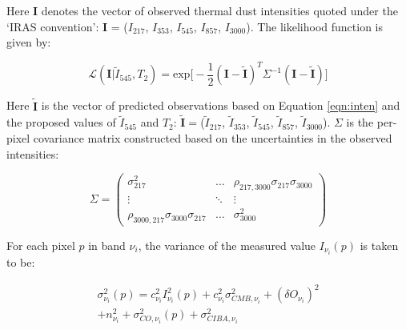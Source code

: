 \documentclass{emulateapj}
\begin{document}
Here $\mathbf{I}$ denotes the vector of observed thermal dust intensities 
quoted under the `IRAS convention': $\mathbf{I}$ = ($I_{217}$, $I_{353}$,
$I_{545}$, $I_{857}$, $I_{3000}$). The likelihood function is given by:

\begin{equation} \label{equ:like}
\mathcal{L}(\mathbf{I}|\tilde{I}_{545}, T_2) = \textrm{exp}\Big[-\frac{1}{2}(\mathbf{I}-\mathbf{\tilde{I}})^T\Sigma^{-1}(\mathbf{I}-\mathbf{\tilde{I}})\Big]
\end{equation}

Here $\mathbf{\tilde{I}}$ is the vector of predicted observations 
based on Equation \ref{eqn:inten} and the proposed values of $\tilde{I}_{545}$ 
and $T_2$: $\mathbf{\tilde{I}} = $($\tilde{I}_{217}$, 
$\tilde{I}_{353}$, $\tilde{I}_{545}$, $\tilde{I}_{857}$, $\tilde{I}_{3000}$). 
$\Sigma$ is the per-pixel covariance matrix constructed based on the 
uncertainties in the observed intensities:

\begin{equation} \label{equ:covariance}
\Sigma = \begin{pmatrix} \sigma^2_{217}                           & \ldots  & \rho_{217,3000}\sigma_{217}\sigma_{3000} \\ 
                         \vdots                                   & \ddots  & \vdots                                   \\
                         \rho_{3000,217}\sigma_{3000}\sigma_{217} & \ldots  & \sigma^2_{3000}
\end{pmatrix}
\end{equation}

For each pixel $p$ in band $\nu_i$, the variance of the measured value 
$I_{\nu_i}(p)$ is taken to be:

\begin{multline}
\sigma^2_{\nu_i}(p) = c^2_{\nu_i}I_{\nu_i}^2(p) + c^2_{\nu_i}\sigma_{CMB, \nu_i}^2 + (\delta O_{\nu_i})^2 \\
+ n_{\nu_i}^2 + \sigma^2_{CO, \nu_i}(p)  + \sigma^2_{CIBA, \nu_i}
\end{multline}
\end{document}
